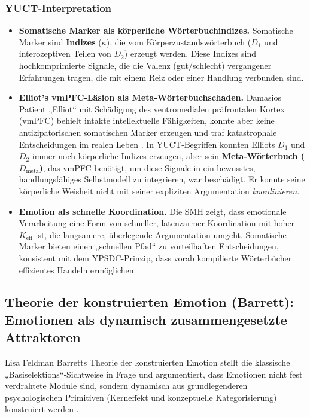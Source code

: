 \documentclass[12pt,a4paper]{article}
\begin{document}
	\subsubsection*{YUCT‑Interpretation}
	\begin{itemize}
		\item \textbf{Somatische Marker als körperliche Wörterbuchindizes.} Somatische Marker sind \textbf{Indizes} (\(\kappa\)), die vom Körperzustandswörterbuch (\(D_1\) und interozeptiven Teilen von \(D_2\)) erzeugt werden. Diese Indizes sind hochkomprimierte Signale, die die Valenz (gut/schlecht) vergangener Erfahrungen tragen, die mit einem Reiz oder einer Handlung verbunden sind.
		\item \textbf{Elliot’s vmPFC‑Läsion als Meta‑Wörterbuchschaden.} Damasios Patient „Elliot“ mit Schädigung des ventromedialen präfrontalen Kortex (vmPFC) behielt intakte intellektuelle Fähigkeiten, konnte aber keine antizipatorischen somatischen Marker erzeugen und traf katastrophale Entscheidungen im realen Leben \cite{Damasio1994}. In YUCT‑Begriffen konnten Elliots \(D_1\) und \(D_2\) immer noch körperliche Indizes erzeugen, aber sein \textbf{Meta‑Wörterbuch (\(D_{\text{meta}}\))}, das vmPFC benötigt, um diese Signale in ein bewusstes, handlungsfähiges Selbstmodell zu integrieren, war beschädigt. Er konnte seine körperliche Weisheit nicht mit seiner expliziten Argumentation \textit{koordinieren}.
		\item \textbf{Emotion als schnelle Koordination.} Die SMH zeigt, dass emotionale Verarbeitung eine Form von schneller, latenzarmer Koordination mit hoher \(K_{\mathrm{eff}}\) ist, die langsamere, überlegende Argumentation umgeht. Somatische Marker bieten einen „schnellen Pfad“ zu vorteilhaften Entscheidungen, konsistent mit dem YPSDC‑Prinzip, dass vorab kompilierte Wörterbücher effizientes Handeln ermöglichen.
	\end{itemize}
	
	\subsection{Theorie der konstruierten Emotion (Barrett): Emotionen als dynamisch zusammengesetzte Attraktoren}
	
	Lisa Feldman Barretts Theorie der konstruierten Emotion stellt die klassische „Basiselektions“‑Sichtweise in Frage und argumentiert, dass Emotionen nicht fest verdrahtete Module sind, sondern dynamisch aus grundlegenderen psychologischen Primitiven (Kerneffekt und konzeptuelle Kategorisierung) konstruiert werden \cite{Barrett2017}.
	
\end{document}

